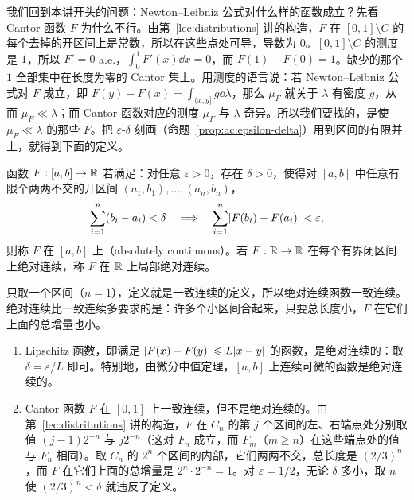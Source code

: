 
我们回到本讲开头的问题：Newton--Leibniz 公式对什么样的函数成立？先看 Cantor 函数 $F$ 为什么不行。由第~\ref{lec:distributions} 讲的构造，$F$ 在 $[0,1]\setminus C$ 的每个去掉的开区间上是常数，所以在这些点处可导，导数为 $0$。$[0,1]\setminus C$ 的测度是 $1$，所以 $F'=0$ a.e.，$\int_0^1F'(x)\dd x=0$，而 $F(1)-F(0)=1$。缺少的那个 $1$ 全部集中在长度为零的 Cantor 集上。用测度的语言说：若 Newton--Leibniz 公式对 $F$ 成立，即 $F(y)-F(x)=\int_{(x,y]}g\dd\lambda$，那么 $\mu_F$ 就关于 $\lambda$ 有密度 $g$，从而 $\mu_F\ll\lambda$；而 Cantor 函数对应的测度 $\mu_F$ 与 $\lambda$ 奇异。所以我们要找的，是使 $\mu_F\ll\lambda$ 的那些 $F$。把 $\varepsilon$-$\delta$ 刻画（命题~\ref{prop:ac:epsilon-delta}）用到区间的有限并上，就得到下面的定义。

\begin{definition}[绝对连续函数]\label{def:ac:ac-function}
函数 $F:[a,b]\to\mathbb{R}$ 若满足：对任意 $\varepsilon>0$，存在 $\delta>0$，使得对 $[a,b]$ 中任意有限个两两不交的开区间 $(a_1,b_1),\dots,(a_n,b_n)$，
\[
\sum_{i=1}^n(b_i-a_i)<\delta\quad\Longrightarrow\quad\sum_{i=1}^n\lvert F(b_i)-F(a_i)\rvert<\varepsilon,
\]
则称 $F$ 在 $[a,b]$ 上（absolutely continuous）。若 $F:\mathbb{R}\to\mathbb{R}$ 在每个有界闭区间上绝对连续，称 $F$ 在 $\mathbb{R}$ 上局部绝对连续。
\end{definition}

只取一个区间（$n=1$），定义就是一致连续的定义，所以绝对连续函数一致连续。绝对连续比一致连续多要求的是：许多个小区间合起来，只要总长度小，$F$ 在它们上面的总增量也小。

\begin{example}\label{ex:ac:ac-functions}
\begin{enumerate}
\item Lipschitz 函数，即满足 $\lvert F(x)-F(y)\rvert\leqslant L\lvert x-y\rvert$ 的函数，是绝对连续的：取 $\delta=\varepsilon/L$ 即可。特别地，由微分中值定理，$[a,b]$ 上连续可微的函数是绝对连续的。
\item Cantor 函数 $F$ 在 $[0,1]$ 上一致连续，但不是绝对连续的。由第~\ref{lec:distributions} 讲的构造，$F$ 在 $C_n$ 的第 $j$ 个区间的左、右端点处分别取值 $(j-1)2^{-n}$ 与 $j2^{-n}$（这对 $F_n$ 成立，而 $F_m$（$m\geqslant n$）在这些端点处的值与 $F_n$ 相同）。取 $C_n$ 的 $2^n$ 个区间的内部，它们两两不交，总长度是 $(2/3)^n$，而 $F$ 在它们上面的总增量是 $2^n\cdot2^{-n}=1$。对 $\varepsilon=1/2$，无论 $\delta$ 多小，取 $n$ 使 $(2/3)^n<\delta$ 就违反了定义。
\end{enumerate}
\end{example}


